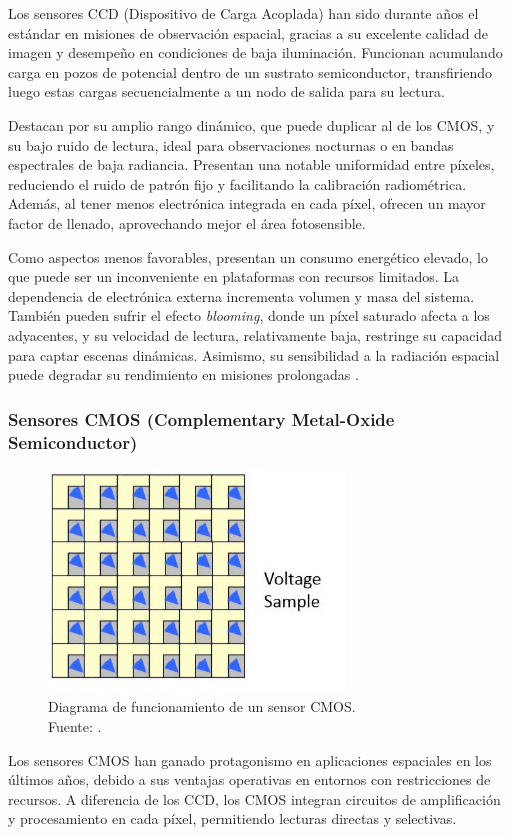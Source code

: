 Los sensores CCD (Dispositivo de Carga Acoplada) han sido durante años el estándar en misiones de observación espacial, gracias a su excelente calidad de imagen y desempeño en condiciones de baja iluminación. Funcionan acumulando carga en pozos de potencial dentro de un sustrato semiconductor, transfiriendo luego estas cargas secuencialmente a un nodo de salida para su lectura.

Destacan por su amplio rango dinámico, que puede duplicar al de los CMOS, y su bajo ruido de lectura, ideal para observaciones nocturnas o en bandas espectrales de baja radiancia. Presentan una notable uniformidad entre píxeles, reduciendo el ruido de patrón fijo y facilitando la calibración radiométrica. Además, al tener menos electrónica integrada en cada píxel, ofrecen un mayor factor de llenado, aprovechando mejor el área fotosensible.

Como aspectos menos favorables, presentan un consumo energético elevado, lo que puede ser un inconveniente en plataformas con recursos limitados. La dependencia de electrónica externa incrementa volumen y masa del sistema. También pueden sufrir el efecto \textit{blooming}, donde un píxel saturado afecta a los adyacentes, y su velocidad de lectura, relativamente baja, restringe su capacidad para captar escenas dinámicas. Asimismo, su sensibilidad a la radiación espacial puede degradar su rendimiento en misiones prolongadas \cite{kuroda_essential_2014}.

\subsubsection{Sensores CMOS (Complementary Metal-Oxide Semiconductor)}

\begin{figure}[H]
    \centering
    \includegraphics[width=0.7\textwidth]{3.Conceptos_Previos/CMOS.jpg}
    \caption{Diagrama de funcionamiento de un sensor CMOS.\\Fuente: \cite{ccd_operation_diagram}.}
    \label{fig:CMOS}
\end{figure}
Los sensores CMOS han ganado protagonismo en aplicaciones espaciales en los últimos años, debido a sus ventajas operativas en entornos con restricciones de recursos. A diferencia de los CCD, los CMOS integran circuitos de amplificación y procesamiento en cada píxel, permitiendo lecturas directas y selectivas.

